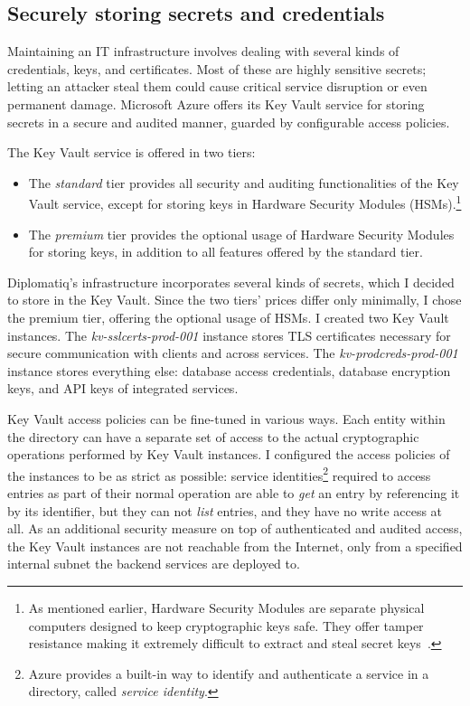 \subsection{Securely storing secrets and credentials}

Maintaining an IT infrastructure involves dealing with several kinds of credentials, keys, and certificates. Most of these are highly sensitive secrets; letting an attacker steal them could cause critical service disruption or even permanent damage. Microsoft Azure offers its Key Vault service for storing secrets in a secure and audited manner, guarded by configurable access policies.

The Key Vault service is offered in two tiers:

\begin{itemize}
\item The \emph{standard} tier provides all security and auditing functionalities of the Key Vault service, except for storing keys in Hardware Security Modules (HSMs).\footnote{As mentioned earlier, Hardware Security Modules are separate physical computers designed to keep cryptographic keys safe. They offer tamper resistance making it extremely difficult to extract and steal secret keys~\cite{fips-140-3}.}
\item The \emph{premium} tier provides the optional usage of Hardware Security Modules for storing keys, in addition to all features offered by the standard tier.
\end{itemize}

Diplomatiq's infrastructure incorporates several kinds of secrets, which I decided to store in the Key Vault. Since the two tiers' prices differ only minimally, I chose the premium tier, offering the optional usage of HSMs. I created two Key Vault instances. The \emph{kv-sslcerts-prod-001} instance stores TLS certificates necessary for secure communication with clients and across services. The \emph{kv-prodcreds-prod-001} instance stores everything else: database access credentials, database encryption keys, and API keys of integrated services.

Key Vault access policies can be fine-tuned in various ways. Each entity within the directory can have a separate set of access to the actual cryptographic operations performed by Key Vault instances. I configured the access policies of the instances to be as strict as possible: service identities\footnote{Azure provides a built-in way to identify and authenticate a service in a directory, called \emph{service identity}.} required to access entries as part of their normal operation are able to \emph{get} an entry by referencing it by its identifier, but they can not \emph{list} entries, and they have no write access at all. As an additional security measure on top of authenticated and audited access, the Key Vault instances are not reachable from the Internet, only from a specified internal subnet the backend services are deployed to.

